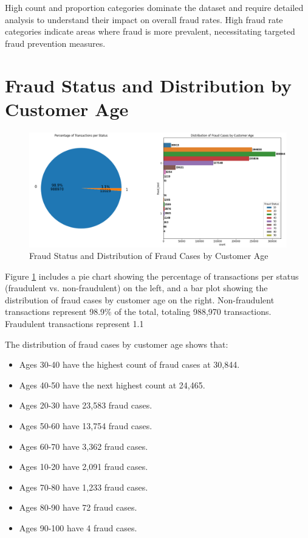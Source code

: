 \documentclass[12pt,a4paper]{report}
\begin{document}
High count and proportion categories dominate the dataset and require detailed analysis to understand their impact on overall fraud rates. High fraud rate categories indicate areas where fraud is more prevalent, necessitating targeted fraud prevention measures.

\section{Fraud Status and Distribution by Customer Age}

\begin{figure}[h]
    \centering
    \includegraphics[width=\textwidth]{Distribution_of_Fraud_Cases.png}
    \caption{Fraud Status and Distribution of Fraud Cases by Customer Age}
    \label{fig:fraud_status_distribution_age}
\end{figure}

Figure \ref{fig:fraud_status_distribution_age} includes a pie chart showing the percentage of transactions per status (fraudulent vs. non-fraudulent) on the left, and a bar plot showing the distribution of fraud cases by customer age on the right. Non-fraudulent transactions represent 98.9\% of the total, totaling 988,970 transactions. Fraudulent transactions represent 1.1%

The distribution of fraud cases by customer age shows that:

\begin{itemize}
    \item Ages 30-40 have the highest count of fraud cases at 30,844.
    \item Ages 40-50 have the next highest count at 24,465.
    \item Ages 20-30 have 23,583 fraud cases.
    \item Ages 50-60 have 13,754 fraud cases.
    \item Ages 60-70 have 3,362 fraud cases.
    \item Ages 10-20 have 2,091 fraud cases.
    \item Ages 70-80 have 1,233 fraud cases.
    \item Ages 80-90 have 72 fraud cases.
    \item Ages 90-100 have 4 fraud cases.
\end{itemize}
\end{document}
